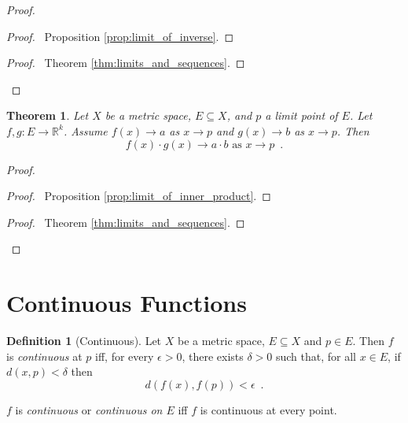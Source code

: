 \documentclass{book}
\let\qed\relax
\newtheorem{thm}[prop]{Theorem}
\theoremstyle{definition}
\newtheorem{df}[prop]{Definition}
\begin{document}
\begin{proof}
\pf
{}
\begin{proof}
	\pf\ Proposition \ref{prop:limit_of_inverse}.
\end{proof}
\qedstep
\begin{proof}
	\pf\ Theorem \ref{thm:limits_and_sequences}.
\end{proof}
\qed
\end{proof}

\begin{thm}
Let $X$ be a metric space, $E \subseteq X$, and $p$ a limit point of $E$. Let $f,g : E \rightarrow \mathbb{R}^k$. Assume $f(x) \rightarrow a$ as $x \rightarrow p$ and $g(x) \rightarrow b$ as $x \rightarrow p$. Then
\[ f(x) \cdot g(x) \rightarrow a \cdot b \text{ as } x \rightarrow p \enspace . \]
\end{thm}

\begin{proof}
\pf
{}
\begin{proof}
	\pf\ Proposition \ref{prop:limit_of_inner_product}.
\end{proof}
\qedstep
\begin{proof}
	\pf\ Theorem \ref{thm:limits_and_sequences}.
\end{proof}
\qed
\end{proof}

\section{Continuous Functions}

\begin{df}[Continuous]
Let $X$ be a metric space, $E \subseteq X$ and $p
 \in E$. Then $f$ is \emph{continuous} at $p$ iff, for every $\epsilon > 0$, there exists $\delta > 0$ such that, for all $x \in E$, if $d(x,p) < \delta$ then
\[ d(f(x),f(p)) < \epsilon \enspace . \]

$f$ is \emph{continuous} or \emph{continuous on $E$} iff $f$ is continuous at every point.
\end{df}
\end{document}
